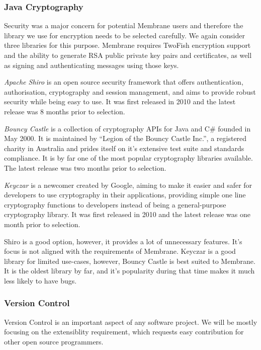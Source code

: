 \documentclass[11pt, a4paper, twocolumn, twoside]{report}
\begin{document}
\subsubsection{Java Cryptography}

Security was a major concern for potential Membrane users and therefore the library we use for encryption needs to be selected carefully. We again consider three libraries for this purpose. Membrane requires TwoFish encryption support and the ability to generate RSA public private key pairs and certificates, as well as signing and authenticating messages using those keys.

\emph{Apache Shiro} is an open source security framework that offers authentication, authorisation, cryptography and session management, and aims to provide robust security while being easy to use. It was first released in 2010 and the latest release was 8 months prior to selection. \citep{apache2017shiro}

\emph{Bouncy Castle} is a collection of cryptography APIs for Java and C\# founded in May 2000. It is maintained by ``Legion of the Bouncy Castle Inc.'', a registered charity in Australia and prides itself on it's extensive test suite and standards compliance. It is by far one of the most popular cryptography libraries available. \citep{bouncy2017castle} The latest release was two months prior to selection.

\emph{Keyczar} is a newcomer created by Google, aiming to make it easier and safer for developers to use cryptography in their applications, providing simple one line cryptography functions to developers instead of being a general-purpose cryptography library. It was first released in 2010 and the latest release was one month prior to selection. \citep{keyczar2017github}

Shiro is a good option, however, it provides a lot of unnecessary features. It's focus is not aligned with the requirements of Membrane. Keyczar is a good library for limited use-cases, however, Bouncy Castle is best suited to Membrane. It is the oldest library by far, and it's popularity during that time makes it much less likely to have bugs.

\subsubsection{Version Control} \label{sec:versionControl}

Version Control is an important aspect of any software project. We will be mostly focusing on the extensiblity requirement, which requests easy contribution for other open source programmers.
\end{document}
